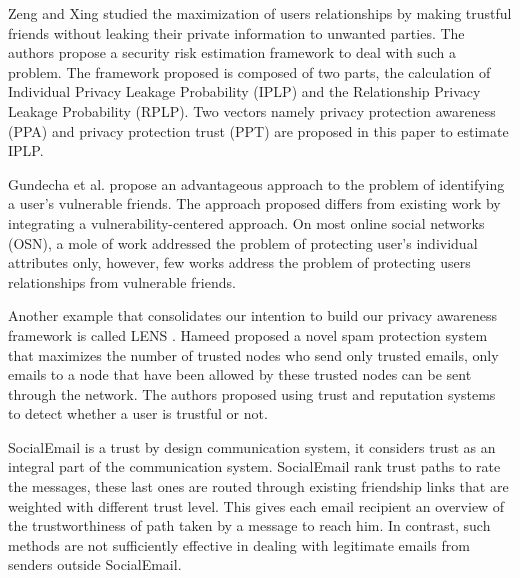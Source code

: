 Zeng and Xing \cite{zeng_trustaware_2014}
	studied the maximization of users relationships by making trustful friends without leaking their private information to unwanted parties.
The authors propose a security risk estimation framework to deal with such a problem.
The framework proposed is composed of two parts,
	the calculation of Individual Privacy Leakage Probability (IPLP) and the Relationship Privacy Leakage Probability (RPLP).
Two vectors namely privacy protection awareness (PPA) and privacy protection trust (PPT) are proposed in this paper to estimate IPLP.

Gundecha et al. \cite{gundecha_exploiting_2011} propose an advantageous approach to the problem of identifying a user’s vulnerable friends.
The approach proposed differs from existing work by integrating a vulnerability-centered approach.
On most online social networks (OSN),
	a mole of work addressed the problem of protecting user's individual attributes only,
	however,
	few works address the problem of protecting users relationships from vulnerable friends.

Another example that consolidates our intention to build our privacy awareness framework is called LENS \cite{hameed_lens_2011}.
Hameed \cite{hameed_lens_2011} proposed a novel spam protection system that maximizes the number of trusted nodes who send only trusted emails,
	only emails to a node that have been allowed by these trusted nodes can be sent through the network.
The authors proposed using trust and reputation systems to detect whether a user is trustful or not.

SocialEmail \cite{tran_social_2010} is a trust by design communication system,
	it considers trust as an integral part of the communication system.
SocialEmail rank trust paths to rate the messages,
	these last ones are routed through existing friendship links that are weighted with different trust level.
This gives each email recipient an overview of the trustworthiness of path taken by a message to reach him.
In contrast,
	such methods are not sufficiently effective in dealing with legitimate emails from senders outside SocialEmail.

